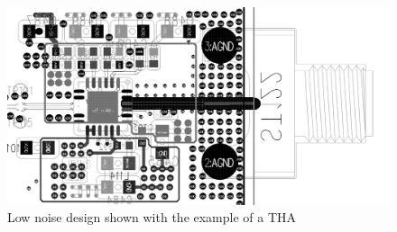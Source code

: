  \begin{figure}[tbh]
 	\centering
 	\includegraphics[width = \textwidth]{chap/04-theresa/img/pcb/tha_pcb}
 	\caption[Stitching vias]{Low noise design shown with the example of a THA}
 	\label{fig:stitch}
 \end{figure}